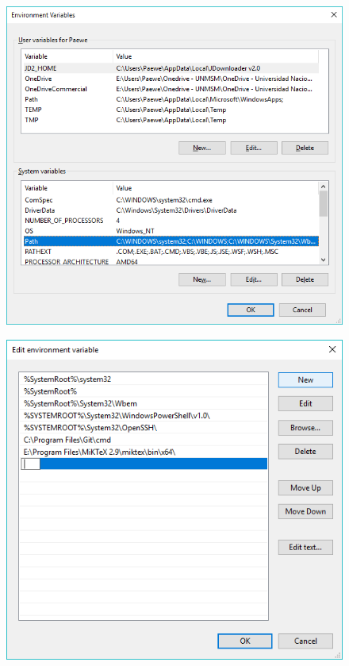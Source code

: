 \documentclass{article}
\begin{document}
\begin{figure}[h!]
  \centering
  \includegraphics[scale=0.75]{./imagenes/Configurar_path3.png}
\end{figure}

\begin{figure}[h!]
  \centering
  \includegraphics[scale=0.75]{./imagenes/Configurar_path4.png}
\end{figure}
\clearpage
\end{document}
